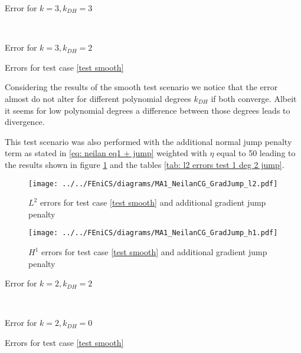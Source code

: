 \begin{table}[h]
	\begin{subtable}[b]{0.45\textwidth}
		\centering
		\pgfplotstabletypeset[columns={iterations, l2error, h1error,N}]\MAOnedegThreeThree
    	\caption{Error for $k=3, k_{DH}=3$}
   \end{subtable}
   ~
	\begin{subtable}[b]{0.45\textwidth}
		\centering
		\pgfplotstabletypeset[columns={iterations, l2error, h1error,N}]\MAOnedegThreeTwo
 	\caption{Error for $k=3, k_{DH}=2$}
	\end{subtable}
	\caption{Errors for test case \ref{test smooth}}
	\label{tab: l2 errors test 1 deg 2}
\end{table}


Considering the results of the smooth test scenario we notice that the error almost do not alter for different polynomial degrees $k_{DH}$ if both converge. Albeit it seems for low polynomial degrees a difference between those degrees leads to divergence.

This test scenario was also performed with the additional normal jump penalty term as stated in \eqref{eq: neilan eq1 + jump} weighted with $\eta$ equal to 50 leading to the results shown in figure \ref{fig: l2 errors test 1 jump} and the tables \ref{tab: l2 errors test 1 deg 2 jump}.

\begin{figure}[h!]
	\texttt{[image: ../../FEniCS/diagrams/MA1\_NeilanCG\_GradJump\_l2.pdf]}
	\caption{$L^2$ errors for test case \ref{test smooth} and additional gradient jump penalty}
	\label{fig: l2 errors test 1 jump}
\end{figure}

\begin{figure}[h!]
	\texttt{[image: ../../FEniCS/diagrams/MA1\_NeilanCG\_GradJump\_h1.pdf]}
	\caption{$H^1$ errors for test case \ref{test smooth} and additional gradient jump penalty}
	\label{fig: h1 errors test 1 jump}
\end{figure}

\begin{table}[h]
	\begin{subtable}[b]{0.45\textwidth}
		\centering
		\pgfplotstabletypeset[columns={iterations, l2error, h1error,N}]\MAOneJumpdegTwoTwo
    	\caption{Error for $k=2, k_{DH}=2$}
   \end{subtable}
   ~
	\begin{subtable}[b]{0.45\textwidth}
		\centering
		\pgfplotstabletypeset[columns={iterations, l2error, h1error,N}]\MAOneJumpdegTwoZero
 	\caption{Error for $k=2, k_{DH}=0$}
	\end{subtable}
	\caption{Errors for test case \ref{test smooth}}
	\label{tab: l2 errors test 1 deg 2 jump}
\end{table}

